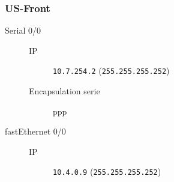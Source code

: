 \subsubsection{US-Front}

	\begin{description}
		\item[Serial 0/0] 
		\begin{description}
			\item[IP] \texttt{10.7.254.2} (\texttt{255.255.255.252})
			\item[Encapsulation serie] ppp
		\end{description}

		\item[fastEthernet 0/0] 
		\begin{description}
			\item[IP] \texttt{10.4.0.9} (\texttt{255.255.255.252})
		\end{description}

	\end{description}
